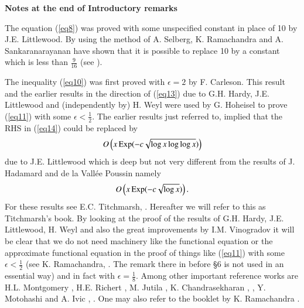 \begin{center}
{\textbf{Notes at the end of Introductory remarks}}
\end{center}


The equation (\ref{eq8}) was proved with some unspecified constant in place of 10 by J.E. Littlewood. By using the method of A. Selberg, K. Ramachandra and A. Sankaranarayanan have shown that it is possible to replace 10  by a constant which is less than $\frac{9}{16}$ (see \cite{Ramachandra and Sankaranarayanan5}).

The inequality (\ref{eq10}) was first proved with $\epsilon =2$ by
F. Carleson. This result and the earlier results in the direction of
(\ref{eq13}) due to G.H. Hardy, J.E. Littlewood and (independently by)
H. Weyl were used by G. Hoheisel to prove (\ref{eq11}) with some
$\epsilon < \frac{1}{2}$. The earlier results just referred to,
implied that the RHS in (\ref{eq14}) could be replaced by 
$$O\left(x \operatorname{Exp} (-c\sqrt{\log x \log \log x})\right)$$ 
due to J.E. Littlewood which is deep but not very different from the
results of  J. Hadamard and de la Vall\'ee Poussin namely 
$$O\left(x\operatorname{Exp} (-c \sqrt{\log x})\right).$$ 
For these results see E.C. Titchmarsh,  
\cite{Titchmarsh1}. Hereafter we will refer to this as Titchmarsh's book. By looking at the proof of the results of G.H. Hardy, J.E. Littlewood, H. Weyl and also the great improvements by I.M. Vinogradov it will be clear that we do not need machinery like the functional equation or the approximate functional equation in the proof of things like (\ref{eq11}) with some $\epsilon < \frac{1}{2}$ (see K. Ramachandra, \cite{Ramachandra1}. The remark there in before \S 6 is not used in an essential way) and in fact with $\epsilon = \frac{1}{8}$. Among other important reference works are H.L. Montgomery \cite{Montgomery1}, H.E. Richert \cite{Richert1}, M. Jutila \cite{Jutila1}, K. Chandrasekharan \cite{Chandrasekharan1}, \cite{Chandrasekharan2}, Y. Motohashi \cite{Motohashi1} and A. Ivic \cite{Ivic1}, \cite{Ivic2}. One may also refer to the booklet by K. Ramachandra \cite{Ramachandra2}.  
